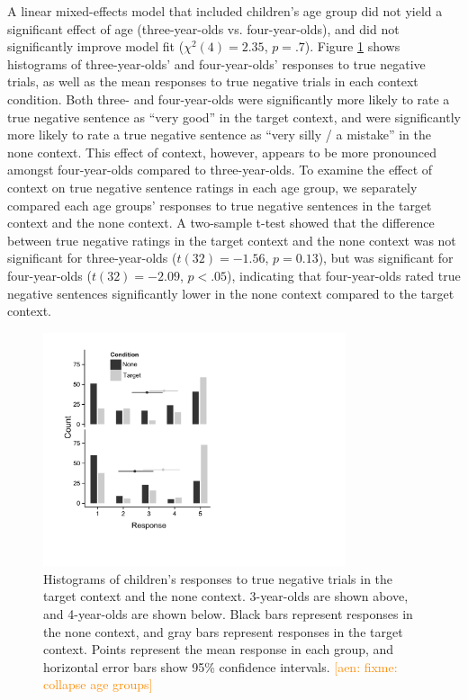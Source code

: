 \documentclass[man, noapacite]{apa2}
\newcommand{\aen}[1]{\textcolor{DarkOrange}{[aen: #1]}}
\begin{document}
A linear mixed-effects model that included children's age group did not yield a significant effect of age (three-year-olds vs. four-year-olds), and did not significantly improve model fit ($\chi ^{2}(4) = 2.35$, $p=.7$). Figure \ref{fig:histograms} shows histograms of three-year-olds' and four-year-olds' responses to true negative trials, as well as the mean responses to true negative trials in each context condition. Both three- and four-year-olds were significantly more likely to rate a true negative sentence as ``very good'' in the target context, and were significantly more likely to rate a true negative sentence as ``very silly / a mistake'' in the none context. This effect of context, however, appears to be more pronounced amongst four-year-olds compared to three-year-olds. To examine the effect of context on true negative sentence ratings in each age group, we separately compared each age groups' responses to true negative sentences in the target context and the none context. A two-sample t-test showed that the difference between true negative ratings in the target context and the none context was not significant for three-year-olds ($t(32) = -1.56$, $p=0.13$), but was significant for four-year-olds ($t(32) = -2.09$, $p<.05$), indicating that four-year-olds rated true negative sentences significantly lower in the none context compared to the target context.


\begin{figure}
\begin{center}
\includegraphics[width=3.5in]{figures/histograms.pdf}
\caption{\label{fig:histograms} Histograms of children's responses to true negative trials in the target context and the none context. 3-year-olds are shown above, and 4-year-olds are shown below. Black bars represent responses in the none context, and gray bars represent responses in the target context. Points represent the mean response in each group, and horizontal error bars show 95\% confidence intervals. \aen{fixme: collapse age groups}}
\end{center}
\end{figure}
\end{document}
